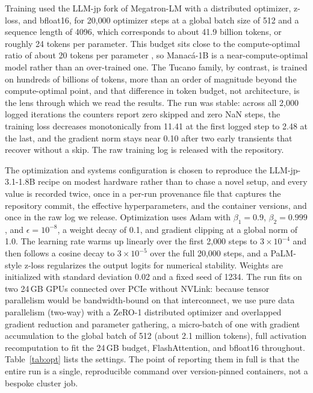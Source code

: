 \documentclass[11pt]{article}
\begin{document}
Training used the LLM-jp fork of Megatron-LM \cite{megatron} with a distributed
optimizer, z-loss,
and bfloat16, for 20{,}000 optimizer steps at a global batch size of 512 and a
sequence length of 4096, which corresponds to about 41.9 billion tokens, or
roughly 24 tokens per parameter. This budget sits close to the compute-optimal
ratio of about 20 tokens per parameter \cite{chinchilla}, so Manac\'a-1B is a
near-compute-optimal model rather than an over-trained one. The Tucano family, by
contrast, is trained on hundreds of billions of tokens, more than an order of
magnitude beyond the compute-optimal point, and that difference in token budget,
not architecture, is the lens through which we read the results. The run was
stable: across all 2{,}000 logged iterations the counters report zero skipped and
zero NaN steps, the training loss decreases monotonically from 11.41 at the first
logged step to 2.48 at the last, and the gradient norm stays near 0.10 after two
early transients that recover without a skip. The raw training log is released with
the repository.

The optimization and systems configuration is chosen to reproduce the LLM-jp-3.1-1.8B
recipe on modest hardware rather than to chase a novel setup, and every value is
recorded twice, once in a per-run provenance file that captures the repository commit,
the effective hyperparameters, and the container versions, and once in the raw log we
release. Optimization uses Adam with $\beta_1=0.9$, $\beta_2=0.999$, and
$\epsilon=10^{-8}$, a weight decay of 0.1, and gradient clipping at a global norm of
1.0. The learning rate warms up linearly over the first 2{,}000 steps to
$3\times10^{-4}$ and then follows a cosine decay to $3\times10^{-5}$ over the full
20{,}000 steps, and a PaLM-style z-loss regularizes the output logits for numerical
stability. Weights are initialized with standard deviation 0.02 and a fixed seed of
1234. The run fits on two 24\,GB GPUs connected over PCIe without NVLink: because
tensor parallelism would be bandwidth-bound on that interconnect, we use pure data
parallelism (two-way) with a ZeRO-1 distributed optimizer and overlapped gradient
reduction and parameter gathering, a micro-batch of one with gradient accumulation to
the global batch of 512 (about 2.1 million tokens), full activation recomputation to
fit the 24\,GB budget, FlashAttention, and bfloat16 throughout. Table~\ref{tab:opt}
lists the settings. The point of reporting them in full is that the entire run is a
single, reproducible command over version-pinned containers, not a bespoke cluster
job.
\end{document}

